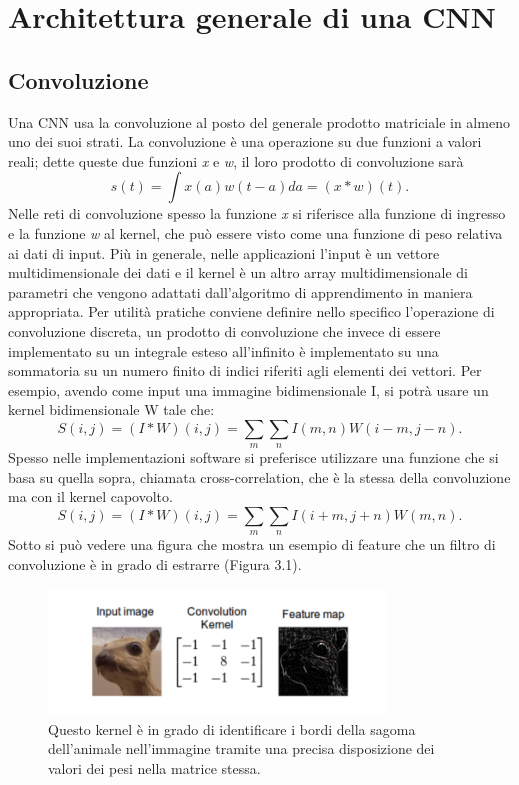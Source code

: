\section{Architettura generale di una CNN}
\subsection{Convoluzione}
Una CNN usa la convoluzione al posto del generale prodotto matriciale in 
almeno uno dei suoi strati. 
La convoluzione è una operazione su due funzioni a valori reali; 
dette queste due funzioni \emph{x} e \emph{w}, il loro prodotto di convoluzione sarà
\[s(t) = \int x(a)w(t-a) da = (x * w) (t).\]
Nelle reti di convoluzione spesso la funzione \emph{x} si riferisce
 alla funzione di ingresso e la funzione \emph{w} al kernel, che può essere visto come una funzione
  di peso relativa ai dati di input. Più in generale, nelle applicazioni l’input 
  è un vettore multidimensionale dei dati e il kernel è un altro array 
  multidimensionale di parametri che vengono adattati dall’algoritmo di
   apprendimento in maniera appropriata. Per utilità pratiche conviene 
   definire nello specifico l’operazione di convoluzione discreta, 
   un prodotto di convoluzione che invece di essere implementato su un integrale
    esteso all’infinito è implementato su una sommatoria su un numero finito di 
    indici riferiti agli elementi dei vettori. Per esempio, avendo come input
     una immagine bidimensionale I, si potrà usare un kernel bidimensionale W tale che:
\[S(i, j) = ( I * W )(i, j) = \sum_{m}\sum_{n} I(m, n)W(i-m, j-n).\]
Spesso nelle implementazioni software si preferisce utilizzare una funzione che si basa su quella sopra,
 chiamata cross-correlation, che è la stessa della convoluzione ma con
  il kernel capovolto. 
  \[S(i, j) = ( I * W )(i, j) = \sum_{m}\sum_{n} I(i+m, j+n)W(m, n).\]
Sotto si può vedere una figura che mostra un esempio di feature che un filtro di convoluzione è in grado di estrarre (Figura 3.1).
     
\begin{figure}[H]
     \centering
     \includegraphics[width=0.8\textwidth]{Figures/feature map.PNG}
     \caption{\small{Questo kernel è in grado di identificare i bordi della sagoma dell'animale nell'immagine tramite una precisa disposizione dei valori dei pesi nella matrice stessa.~\cite{feature}}
     } %
     \label{fi:dcalc}
   \end{figure}
   
